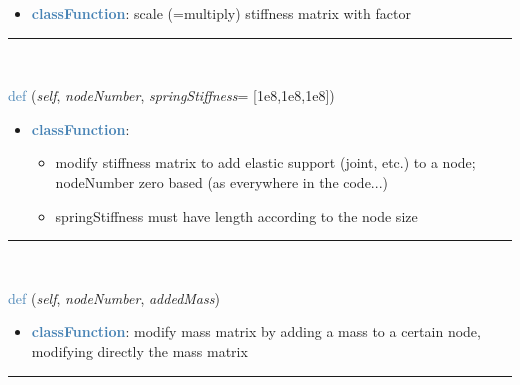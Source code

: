 \begin{itemize}[leftmargin=1.4cm]
\begin{itemize}[leftmargin=1.4cm]
\begin{itemize}[leftmargin=1.4cm]
\begin{itemize}[leftmargin=0.5cm]
\begin{itemize}[leftmargin=1.4cm]
\begin{itemize}[leftmargin=1.4cm]
\begin{itemize}[leftmargin=1.4cm]
\begin{itemize}[leftmargin=0.5cm]
\setlength{\itemindent}{0.7cm}
\begin{itemize}[leftmargin=0.7cm]
\item[--]\textcolor{steelblue}{\bf classFunction}: scale (=multiply) stiffness matrix with factor
\vspace{12pt}\end{itemize}
%
\noindent\rule{8cm}{0.75pt}\vspace{1pt} \\ 
\begin{flushleft}
\noindent \textcolor{steelblue}{def {\bf {}}}\label{sec:FEM:FEMinterface:AddElasticSupportAtNode}
({\it self}, {\it nodeNumber}, {\it springStiffness}= [1e8,1e8,1e8])
\end{flushleft}
\setlength{\itemindent}{0.7cm}
\begin{itemize}[leftmargin=0.7cm]
\item[--]\textcolor{steelblue}{\bf classFunction}: \vspace{-6pt}
\begin{itemize}[leftmargin=1.2cm]
\setlength{\itemindent}{-0.7cm}
\item[]modify stiffness matrix to add elastic support (joint, etc.) to a node; nodeNumber zero based (as everywhere in the code...)
\item[]springStiffness must have length according to the node size
\end{itemize}
\vspace{12pt}\end{itemize}
%
\noindent\rule{8cm}{0.75pt}\vspace{1pt} \\ 
\begin{flushleft}
\noindent \textcolor{steelblue}{def {\bf {}}}\label{sec:FEM:FEMinterface:AddNodeMass}
({\it self}, {\it nodeNumber}, {\it addedMass})
\end{flushleft}
\setlength{\itemindent}{0.7cm}
\begin{itemize}[leftmargin=0.7cm]
\item[--]\textcolor{steelblue}{\bf classFunction}: modify mass matrix by adding a mass to a certain node, modifying directly the mass matrix
\vspace{12pt}\end{itemize}
%
\noindent\rule{8cm}{0.75pt}\vspace{1pt} \\ 

\end{itemize}
\end{itemize}
\end{itemize}
\end{itemize}
\end{itemize}
\end{itemize}
\end{itemize}
\end{itemize}
